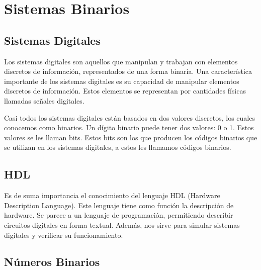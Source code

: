 \section{Sistemas Binarios}

\subsection{Sistemas Digitales}

Los sistemas digitales son aquellos que manipulan y trabajan con elementos discretos de información, 
representados de una forma binaria. Una característica importante de los sistemas digitales es su 
capacidad de manipular elementos discretos de información. Estos elementos se representan por 
cantidades físicas llamadas señales digitales. 

Casi todos los sistemas digitales están basados en dos valores discretos, los cuales conocemos como binarios. 
Un dígito binario puede tener dos valores: 0 o 1. Estos valores se les llaman bits. Estos bits son los que producen 
los códigos binarios que se utilizan en los sistemas digitales, a estos les llamamos códigos binarios.

\subsection*{HDL}

Es de suma importancia el conocimiento del lenguaje HDL (Hardware Description Language). Este lenguaje 
tiene como función la descripción de hardware. Se parece a un lenguaje de programación, 
permitiendo describir circuitos digitales en forma textual. Además, nos sirve para simular sistemas digitales 
y verificar su funcionamiento.

\begin{center}
\end{center}

\subsection{Números Binarios}